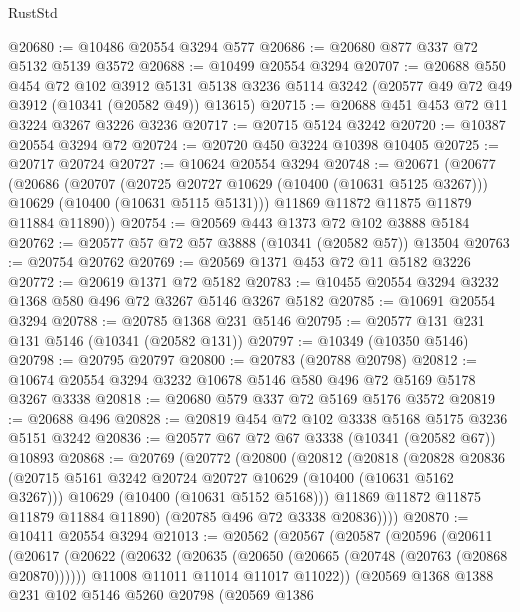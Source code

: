 \begin{lexlean}{RustStd}
\begin{coremodule}
@20680 := @10486 @20554 @3294 @577
@20686 := @20680 @877 @337 @72 @5132 @5139 @3572
@20688 := @10499 @20554 @3294
@20707 := @20688
    @550
    @454
    @72
    @102
    @3912
    @5131
    @5138
    @3236
    @5114
    @3242
    (@20577 @49 @72 @49 @3912 (@10341 (@20582 @49)) @13615)
@20715 := @20688 @451 @453 @72 @11 @3224 @3267 @3226 @3236
@20717 := @20715 @5124 @3242
@20720 := @10387 @20554 @3294 @72
@20724 := @20720 @450 @3224 @10398 @10405
@20725 := @20717 @20724
@20727 := @10624 @20554 @3294
@20748 := @20671
    (@20677
      (@20686
        (@20707
          (@20725 @20727 @10629 (@10400 (@10631 @5125 @3267)))
          @10629
          (@10400 (@10631 @5115 @5131)))
        @11869
        @11872
        @11875
        @11879
        @11884
        @11890))
@20754 := @20569 @443 @1373 @72 @102 @3888 @5184
@20762 := @20577 @57 @72 @57 @3888 (@10341 (@20582 @57)) @13504
@20763 := @20754 @20762
@20769 := @20569 @1371 @453 @72 @11 @5182 @3226
@20772 := @20619 @1371 @72 @5182
@20783 := @10455 @20554 @3294 @3232 @1368 @580 @496 @72 @3267 @5146 @3267 @5182
@20785 := @10691 @20554 @3294
@20788 := @20785 @1368 @231 @5146
@20795 := @20577 @131 @231 @131 @5146 (@10341 (@20582 @131))
@20797 := @10349 (@10350 @5146)
@20798 := @20795 @20797
@20800 := @20783 (@20788 @20798)
@20812 := @10674 @20554 @3294 @3232 @10678 @5146 @580 @496 @72 @5169 @5178 @3267 @3338
@20818 := @20680 @579 @337 @72 @5169 @5176 @3572
@20819 := @20688 @496
@20828 := @20819 @454 @72 @102 @3338 @5168 @5175 @3236 @5151 @3242
@20836 := @20577 @67 @72 @67 @3338 (@10341 (@20582 @67)) @10893
@20868 := @20769
    (@20772
      (@20800
        (@20812
          (@20818
            (@20828
              @20836
              (@20715 @5161 @3242 @20724 @20727 @10629 (@10400 (@10631 @5162 @3267)))
              @10629
              (@10400 (@10631 @5152 @5168)))
            @11869
            @11872
            @11875
            @11879
            @11884
            @11890)
          (@20785 @496 @72 @3338 @20836))))
@20870 := @10411 @20554 @3294
@21013 := @20562
    (@20567
      (@20587
        (@20596
          (@20611
            (@20617
              (@20622
                (@20632
                  (@20635 (@20650 (@20665 (@20748 (@20763 (@20868 @20870))))))
                  @11008
                  @11011
                  @11014
                  @11017
                  @11022))
              (@20569
                @1368
                @1388
                @231
                @102
                @5146
                @5260
                @20798
                (@20569
                  @1386

\end{coremodule}
\end{lexlean}

